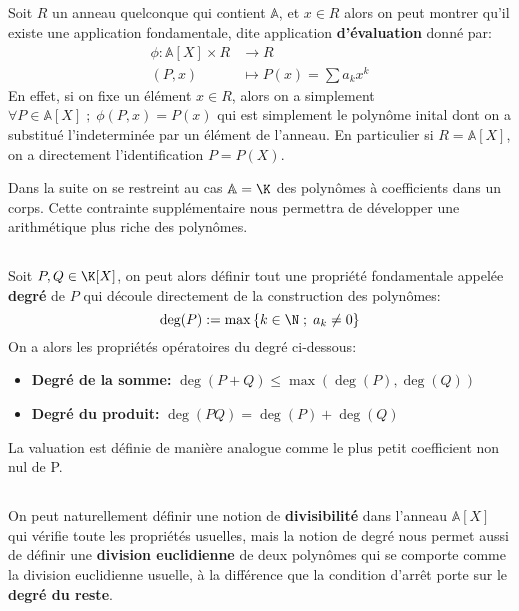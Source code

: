 \subsection*{}
Soit \( R \) un anneau quelconque qui contient \( \mathbb{A} \), et \( x \in R \) alors on peut montrer qu'il existe une application fondamentale, dite application \textbf{d'évaluation} donné par:
\[ 
   \begin{aligned}
      \phi : \mathbb{A}[X] \times R &\longrightarrow R \\
      (P, x) &\longmapsto P(x) = \sum a_kx^k
   \end{aligned} 
\]
En effet, si on fixe un élément \( x \in R \), alors on a simplement \( \forall P \in \mathbb{A}[X] \; ; \; \phi(P, x) = P(x) \) qui est simplement le polynôme inital dont on a substitué l'indeterminée par un élément de l'anneau. En particulier si \( R = \mathbb{A}[X] \), on a directement l'identification \( P = P(X) \).
\pagebreak

Dans la suite on se restreint au cas \( \mathbb{A} = \K \) des polynômes à coefficients dans un corps. Cette contrainte supplémentaire nous permettra de développer une arithmétique plus riche des polynômes.
\subsection*{}
Soit \(P, Q \in \K[X]\), on peut alors définir tout une propriété fondamentale appelée \textbf{degré} de \(P\) qui découle directement de la construction des polynômes:
\[ 
   \text{deg}(P) := \max\left\{ k \in \N \; ; \; a_k \neq 0 \right\}  
\]
On a alors les propriétés opératoires du degré ci-dessous:
\begin{itemize}
   \item \textbf{Degré de la somme: }\( \deg(P + Q) \leq \max(\deg(P), \deg(Q)) \)
   \item \textbf{Degré du produit: }\( \deg(PQ) = \deg(P) + \deg(Q) \) 
\end{itemize}
La valuation est définie de manière analogue comme le plus petit coefficient non nul de P.
\subsection*{}
On peut naturellement définir une notion de \textbf{divisibilité} dans l'anneau \( \mathbb{A}[X] \) qui vérifie toute les propriétés usuelles, mais la notion de degré nous permet aussi de définir une \textbf{division euclidienne} de deux polynômes qui se comporte comme la division euclidienne usuelle, à la différence que la condition d'arrêt porte sur le \textbf{degré du reste}.\<

